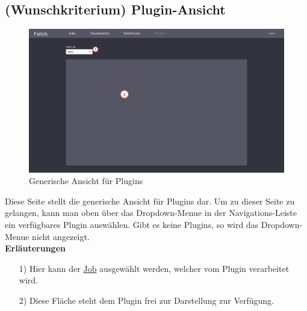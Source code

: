 
\subsection{(Wunschkriterium) Plugin-Ansicht}
\label{pages:plugin}
\begin{figure}[H]
    \centering
    \includegraphics[width=\textwidth]{images-interface/v4_interface/plugin_page_4.pdf}
    \caption{Generische Ansicht für \glspl{Plugin}}
    \label{fig:plugin-page}
\end{figure}
Diese Seite stellt die generische Ansicht für \glspl{Plugin} dar. Um zu dieser Seite zu gelangen, kann man oben über das \gls{Dropdown-Menue} in der Navigations-Leiste ein verfügbares \gls{Plugin} auswählen. Gibt es keine \glspl{Plugin}, so wird das \gls{Dropdown-Menue} nicht angezeigt. \\

\textbf{Erläuterungen}
\begin{itemize}
    \item[1)] Hier kann der \hyperref[B:Jobs]{Job} ausgewählt werden, welcher vom \gls{Plugin} verarbeitet wird.
    \item[2)] Diese Fläche steht dem \gls{Plugin} frei zur Darstellung zur Verfügung.
\end{itemize}

\newpage
